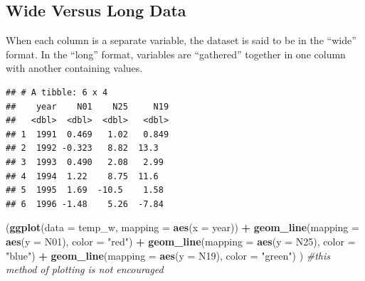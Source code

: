 \documentclass[]{article}
\newenvironment{Shaded}{\begin{snugshade}}{\end{snugshade}}
\newcommand{\KeywordTok}[1]{\textcolor[rgb]{0.13,0.29,0.53}{\textbf{#1}}}
\newcommand{\DataTypeTok}[1]{\textcolor[rgb]{0.13,0.29,0.53}{#1}}
\newcommand{\DecValTok}[1]{\textcolor[rgb]{0.00,0.00,0.81}{#1}}
\newcommand{\StringTok}[1]{\textcolor[rgb]{0.31,0.60,0.02}{#1}}
\newcommand{\CommentTok}[1]{\textcolor[rgb]{0.56,0.35,0.01}{\textit{#1}}}
\newcommand{\OperatorTok}[1]{\textcolor[rgb]{0.81,0.36,0.00}{\textbf{#1}}}
\newcommand{\NormalTok}[1]{#1}
\begin{document}
\subsection{Wide Versus Long Data}\label{wide-versus-long-data}

When each column is a separate variable, the dataset is said to be in
the ``wide'' format. In the ``long'' format, variables are ``gathered''
together in one column with another containing values.

\begin{Shaded}
\end{Shaded}

\begin{verbatim}
## # A tibble: 6 x 4
##    year    N01    N25     N19
##   <dbl>  <dbl>  <dbl>   <dbl>
## 1  1991  0.469   1.02   0.849
## 2  1992 -0.323   8.82  13.3  
## 3  1993  0.490   2.08   2.99 
## 4  1994  1.22    8.75  11.6  
## 5  1995  1.69  -10.5    1.58 
## 6  1996 -1.48    5.26  -7.84
\end{verbatim}

\begin{Shaded}
\begin{Highlighting}[]
\NormalTok{(}\KeywordTok{ggplot}\NormalTok{(}\DataTypeTok{data =}\NormalTok{ temp_w,}
        \DataTypeTok{mapping =} \KeywordTok{aes}\NormalTok{(}\DataTypeTok{x =}\NormalTok{ year)) }\OperatorTok{+}\StringTok{ }
\StringTok{    }\KeywordTok{geom_line}\NormalTok{(}\DataTypeTok{mapping =} \KeywordTok{aes}\NormalTok{(}\DataTypeTok{y =}\NormalTok{ N01), }\DataTypeTok{color =} \StringTok{"red"}\NormalTok{) }\OperatorTok{+}
\StringTok{    }\KeywordTok{geom_line}\NormalTok{(}\DataTypeTok{mapping =} \KeywordTok{aes}\NormalTok{(}\DataTypeTok{y =}\NormalTok{ N25), }\DataTypeTok{color =} \StringTok{"blue"}\NormalTok{) }\OperatorTok{+}
\StringTok{    }\KeywordTok{geom_line}\NormalTok{(}\DataTypeTok{mapping =} \KeywordTok{aes}\NormalTok{(}\DataTypeTok{y =}\NormalTok{ N19), }\DataTypeTok{color =} \StringTok{"green"}\NormalTok{)}
\NormalTok{  ) }\CommentTok{#this method of plotting is not encouraged}
\end{Highlighting}
\end{Shaded}
\end{document}
